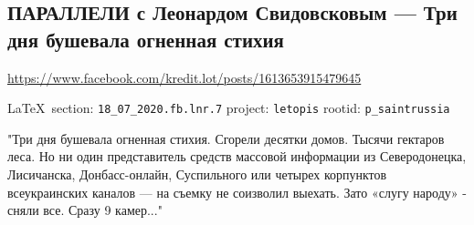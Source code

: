  
 
  
\subsection{ПАРАЛЛЕЛИ с Леонардом Свидовсковым --- Три дня бушевала огненная стихия}
\url{https://www.facebook.com/kredit.lot/posts/1613653915479645}

\vspace{0.5cm}
{\small\LaTeX~section: \verb|18_07_2020.fb.lnr.7| project: \verb|letopis| rootid: \verb|p_saintrussia|}
\vspace{0.5cm}

"Три дня бушевала огненная стихия. Сгорели десятки домов. Тысячи гектаров леса.
Но ни один представитель средств массовой информации из Северодонецка,
Лисичанска, Донбасс-онлайн, Суспильного или четырех корпунктов всеукраинских
каналов --- на съемку не соизволил выехать. Зато «слугу народу» - сняли все.
Сразу 9 камер..."

